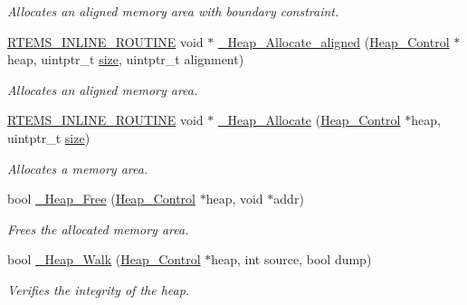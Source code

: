 \begin{DoxyCompactItemize}
\begin{DoxyCompactList}\small\item\em Allocates an aligned memory area with boundary constraint. \end{DoxyCompactList}\item 
\mbox{\hyperlink{group__RTEMSScoreBaseDefs_gac216239df231d5dbd15e3520b0b9313f}{R\+T\+E\+M\+S\+\_\+\+I\+N\+L\+I\+N\+E\+\_\+\+R\+O\+U\+T\+I\+NE}} void $\ast$ \mbox{\hyperlink{group__RTEMSScoreHeap_ga951f109f2bfe07c7a769714f97b96a35}{\+\_\+\+Heap\+\_\+\+Allocate\+\_\+aligned}} (\mbox{\hyperlink{structHeap__Control}{Heap\+\_\+\+Control}} $\ast$heap, uintptr\+\_\+t \mbox{\hyperlink{sun4u_2tte_8h_a245260f6f74972558f61b85227df5aae}{size}}, uintptr\+\_\+t alignment)
\begin{DoxyCompactList}\small\item\em Allocates an aligned memory area. \end{DoxyCompactList}\item 
\mbox{\hyperlink{group__RTEMSScoreBaseDefs_gac216239df231d5dbd15e3520b0b9313f}{R\+T\+E\+M\+S\+\_\+\+I\+N\+L\+I\+N\+E\+\_\+\+R\+O\+U\+T\+I\+NE}} void $\ast$ \mbox{\hyperlink{group__RTEMSScoreHeap_gad26c02ca60b04b7e5845ec959f6d4330}{\+\_\+\+Heap\+\_\+\+Allocate}} (\mbox{\hyperlink{structHeap__Control}{Heap\+\_\+\+Control}} $\ast$heap, uintptr\+\_\+t \mbox{\hyperlink{sun4u_2tte_8h_a245260f6f74972558f61b85227df5aae}{size}})
\begin{DoxyCompactList}\small\item\em Allocates a memory area. \end{DoxyCompactList}\item 
bool \mbox{\hyperlink{group__RTEMSScoreHeap_gab9a1cc19751295ceb71d1d495fa56b39}{\+\_\+\+Heap\+\_\+\+Free}} (\mbox{\hyperlink{structHeap__Control}{Heap\+\_\+\+Control}} $\ast$heap, void $\ast$addr)
\begin{DoxyCompactList}\small\item\em Frees the allocated memory area. \end{DoxyCompactList}\item 
bool \mbox{\hyperlink{group__RTEMSScoreHeap_ga914249a9e285bdbd75ea1699a5771a7a}{\+\_\+\+Heap\+\_\+\+Walk}} (\mbox{\hyperlink{structHeap__Control}{Heap\+\_\+\+Control}} $\ast$heap, int source, bool dump)
\begin{DoxyCompactList}\small\item\em Verifies the integrity of the heap. \end{DoxyCompactList}\item 

\end{DoxyCompactItemize}
